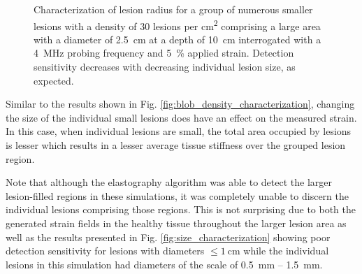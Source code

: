 \begin{figure}[!htb]
				\label{fig:blob_elastogram}
			\end{figure}

			\begin{figure}[!htb]
				\centering
				\caption[Quasi-static clustered lesion radius characterization]{Characterization of lesion radius for a group of numerous smaller lesions with a density of 30 lesions per \si{\cm\squared} comprising a large area with a diameter of \SI{2.5}{\cm} at a depth of \SI{10}{\cm} interrogated with a \SI{4}{\MHz} probing frequency and \SI{5}{\percent} applied strain. Detection sensitivity decreases with decreasing individual lesion size, as expected.}
				\label{fig:blob_radius_characterization}
			\end{figure}

			Similar to the results shown in Fig. \ref{fig:blob_density_characterization}, changing the size of the individual small lesions does have an effect on the measured strain. In this case, when individual lesions are small, the total area occupied by lesions is lesser which results in a lesser average tissue stiffness over the grouped lesion region.

			Note that although the elastography algorithm was able to detect the larger lesion-filled regions in these simulations, it was completely unable to discern the individual lesions comprising those regions. This is not surprising due to both the generated strain fields in the healthy tissue throughout the larger lesion area as well as the results presented in Fig. \ref{fig:size_characterization} showing poor detection sensitivity for lesions with diameters $\leq \SI{1}{\cm}$ while the individual lesions in this simulation had diameters of the scale of \SI{0.5}{\mm} -- \SI{1.5}{\mm}.

